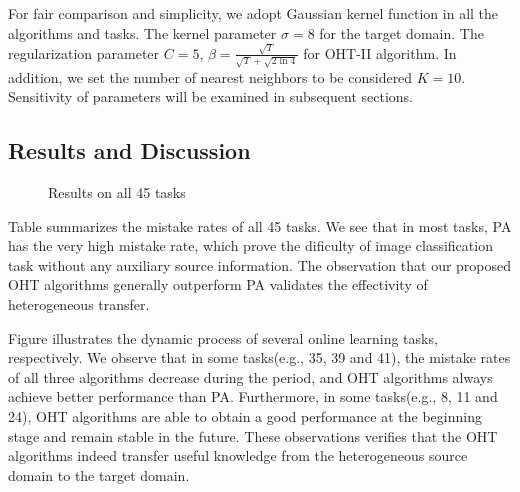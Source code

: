 \documentclass[twocolumn]{article}
\begin{document}
For fair comparison and simplicity, we adopt Gaussian kernel function in all the algorithms and tasks.
The kernel parameter $\sigma = 8$ for the target domain.
The regularization parameter $C = 5$, $ \beta = \frac{\sqrt{T}}{\sqrt{T}+\sqrt{2\ln{4}}} $ for OHT-II algorithm.
In addition, we set the number of nearest neighbors to be considered $K = 10$.
Sensitivity of parameters will be examined in subsequent sections.

\subsection{Results and Discussion}

\begin{figure}[!htb]
\begin{center}
\end{center}
  \caption{Results on all 45 tasks}
  \label{Results}
\end{figure}

Table summarizes the mistake rates of all 45 tasks.
We see that in most tasks, PA has the very high mistake rate, which prove the dificulty of image classification task without any auxiliary source information.
The observation that our proposed OHT algorithms generally outperform PA validates the effectivity of heterogeneous transfer.

Figure illustrates the dynamic process of several online learning tasks, respectively.
We observe that in some tasks(e.g., 35, 39 and 41), the mistake rates of all three algorithms decrease during the period, and OHT algorithms always achieve better performance than PA.
Furthermore, in some tasks(e.g., 8, 11 and 24), OHT algorithms are able to obtain a good performance at the beginning stage and remain stable in the future.
These observations verifies that the OHT algorithms indeed transfer useful knowledge from the heterogeneous source domain to the target domain. 
\end{document}
